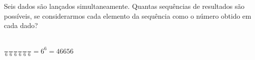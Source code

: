 \begin{ex}
 Seis dados são lançados simultaneamente. Quantas sequências de resultados são possíveis, se considerarmos cada elemento da sequência como o número obtido em cada dado?
 \begin{sol}
     \phantom{A} \\
 $\frac{\phantom{A}}{6}\frac{\phantom{A}}{6}\frac{\phantom{A}}{6}\frac{\phantom{A}}{6}\frac{\phantom{A}}{6}\frac{\phantom{A}}{6}=6^6=46656$
 \end{sol}
\end{ex}